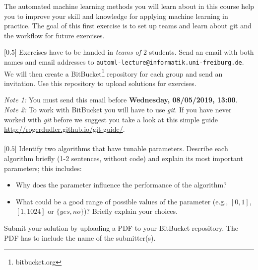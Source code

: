 \documentclass{exam}
\begin{document}
\noindent
The automated machine learning methods you will learn about in this course help you to improve your skill and knowledge for applying machine learning in practice. The goal of this first exercise is to set up teams and learn about git and the workflow for future exercises.\vspace*{5pt}

\begin{questions}
   [$0.5$]
    Exercises have to be handed in \emph{teams of $2$} students. Send an email with both names and email addresses to \texttt{automl-lecture@informatik.uni-freiburg.de}. We will then create a BitBucket\footnote{bitbucket.org} repository for each group and send an invitation. Use this repository to upload solutions for exercises.
  
  \emph{Note 1:} You must send this email before \textbf{Wednesday, 08/05/2019, 13:00}. \\
  \emph{Note 2:} To work with BitBucket you will have to use \emph{git}. If you have never worked with \emph{git} before we suggest you take a look at this simple guide \url{http://rogerdudler.github.io/git-guide/}. 
    \\\vspace*{-5pt}\hspace*{-2pt}
\\

	[$0.5$]
		Identify two algorithms that have tunable parameters. Describe each algorithm briefly (1-2 sentences, without code) and explain its most important parameters; this includes:
		\begin{itemize}
		  \item Why does the parameter influence the performance of the algorithm? 
		  \item What could be a good range of possible values of the parameter (e.g., $[0,1]$, $[1,1024]$ or $\{yes,no\}$)? Briefly explain your choices.
		\end{itemize}
		Submit your solution by uploading a PDF to your BitBucket repository. The PDF has to include the name of the submitter(s).
		
\end{questions}
\end{document}
